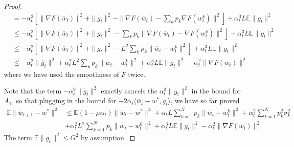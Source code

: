 \begin{proof}
\begin{align*}
	& =-\alpha_{t}^{2}\left[\|\nabla F(\overline{w}_{t})\|^{2}+\|\overline{g}_{t}\|^{2}-\|\nabla F(\overline{w}_{t})-\sum_{k}p_{k}\nabla F(w_{t}^{k})\|^{2}\right]+\alpha_{t}^{3}L\mathbb{E}\|g_{t}\|^{2}\\
	& \leq-\alpha_{t}^{2}\left[\|\nabla F(\overline{w}_{t})\|^{2}+\|\overline{g}_{t}\|^{2}-\sum_{k}p_{k}\|\nabla F(\overline{w}_{t})-\nabla F(w_{t}^{k})\|^{2}\right]+\alpha_{t}^{3}L\mathbb{E}\|g_{t}\|^{2}\\
	& \leq-\alpha_{t}^{2}\left[\|\nabla F(\overline{w}_{t})\|^{2}+\|\overline{g}_{t}\|^{2}-L^{2}\sum_{k}p_{k}\|\overline{w}_{t}-w_{t}^{k}\|^{2}\right]+\alpha_{t}^{3}L\mathbb{E}\|g_{t}\|^{2}\\
	& \leq-\alpha_{t}^{2}\|\overline{g}_{t}\|^{2}+\alpha_{t}^{2}L^{2}\sum_{k}p_{k}\|\overline{w}_{t}-w_{t}^{k}\|^{2}+\alpha_{t}^{3}L\mathbb{E}\|g_{t}\|^{2}-\alpha_{t}^{2}\|\nabla F(\overline{w}_{t})\|^{2}
	\end{align*}
	where we have used the smoothness of $F$ twice. 
	
	Note that the term $-\alpha_{t}^{2}\|\overline{g}_{t}\|^{2}$ exactly
	cancels the $\alpha_{t}^{2}\|\overline{g}_{t}\|^{2}$ in the bound
	for $A_{1}$, so that plugging in the bound for $-2\alpha_{t}\langle\overline{w}_{t}-w^{\ast},\overline{g}_{t}\rangle$,
	we have so far proved 
	\begin{align*}
	\mathbb{E}\|\overline{w}_{t+1}-w^{\ast}\|^{2} & \leq\mathbb{E}(1-\mu\alpha_{t})\|\overline{w}_{t}-w^{\ast}\|^{2}+\alpha_{t}L\sum_{k=1}^{N}p_{k}\|\overline{w}_{t}-w_{t}^{k}\|^{2}+\alpha_{t}^{2}\sum_{k=1}^{N}p_{k}^{2}\sigma_{k}^{2}\\
	& +\alpha_{t}^{2}L^{2}\sum_{k=1}^{N}p_{k}\|\overline{w}_{t}-w_{t}^{k}\|^{2}+\alpha_{t}^{3}L\mathbb{E}\|g_{t}\|^{2}-\alpha_{t}^{2}\|\nabla F(\overline{w}_{t})\|^{2}
	\end{align*}
	The term $\mathbb{E}\|g_{t}\|^{2}\leq G^{2}$ by assumption. 
	

\end{proof}
